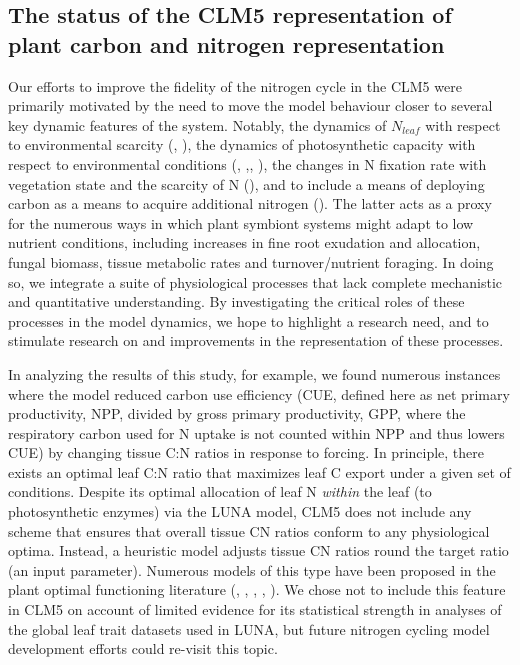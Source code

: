 \usepackage{}\documentclass[draft,linenumbers]{agujournal}
\begin{document}
\subsection{The status of the CLM5 representation of plant carbon and nitrogen representation}
Our efforts to improve the fidelity of the nitrogen cycle in the CLM5 were primarily motivated by the need to move the model behaviour closer to several key dynamic features of the system. Notably, the dynamics of $N_{leaf}$ with respect to environmental scarcity (\cite{lovelock1998}, \cite{brzostek2014}), the dynamics of photosynthetic capacity with respect to environmental conditions (\cite{xu2012}, \cite{ali2016},\cite{rogers2017}, \cite{bloomfield2018}), the changes in N fixation rate with vegetation state and the scarcity of N (\cite{vitousek2002}), and to include a means of deploying carbon as a means to acquire additional nitrogen (\cite{terrer2018}). The latter acts as a proxy for the numerous ways in which plant symbiont systems might adapt to low nutrient conditions, including increases in fine root exudation and allocation, fungal biomass, tissue metabolic rates and turnover/nutrient foraging.  In doing so, we integrate a suite of physiological processes that lack complete mechanistic and quantitative understanding.  By investigating the critical roles of these processes in the model dynamics, we hope to highlight a research need, and to stimulate research on and improvements in the representation of these processes.

In analyzing the results of this study, for example, we found numerous instances where the model reduced carbon use efficiency (CUE, defined here as net primary productivity, NPP, divided by gross primary productivity, GPP, where the respiratory carbon used for N uptake is not counted within NPP and thus lowers CUE) by changing tissue C:N ratios in response to forcing. In principle, there exists an optimal leaf C:N ratio that maximizes leaf C export under a given set of conditions. Despite its optimal allocation of leaf N \emph{within} the leaf (to photosynthetic enzymes) via the LUNA model, CLM5 does not include any scheme that ensures that overall tissue CN ratios conform to any physiological optima. Instead, a heuristic model adjusts tissue CN ratios round the target ratio (an input parameter).  Numerous models of this type have been proposed in the plant optimal functioning literature (\cite{vanwijk2003}, \cite{mcmurtrie2011}, \cite{anten2011} \cite{franklin2012}, \cite{mcmurtrie2013}, \cite{thomas2014}). We chose not to include this feature in CLM5 on account of limited evidence for its statistical strength in analyses of the global leaf trait datasets used in  LUNA, but future nitrogen cycling model development efforts could re-visit this topic. 
\end{document}

